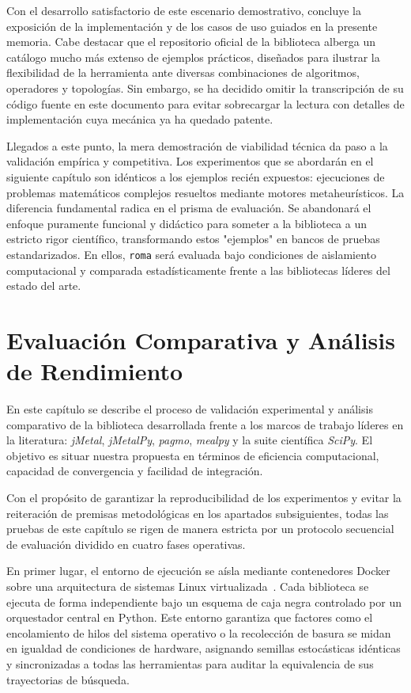 \documentclass[12pt,a4paper,twoside,openright]{book}
\begin{document}

    Con el desarrollo satisfactorio de este escenario demostrativo, concluye la exposición de la implementación y de los casos de uso guiados en la presente memoria. Cabe destacar que el repositorio oficial de la biblioteca alberga un catálogo mucho más extenso de ejemplos prácticos, diseñados para ilustrar la flexibilidad de la herramienta ante diversas combinaciones de algoritmos, operadores y topologías. Sin embargo, se ha decidido omitir la transcripción de su código fuente en este documento para evitar sobrecargar la lectura con detalles de implementación cuya mecánica ya ha quedado patente.

    Llegados a este punto, la mera demostración de viabilidad técnica da paso a la validación empírica y competitiva. Los experimentos que se abordarán en el siguiente capítulo son idénticos a los ejemplos recién expuestos: ejecuciones de problemas matemáticos complejos resueltos mediante motores metaheurísticos. La diferencia fundamental radica en el prisma de evaluación. Se abandonará el enfoque puramente funcional y didáctico para someter a la biblioteca a un estricto rigor científico, transformando estos "ejemplos" en bancos de pruebas estandarizados. En ellos, \texttt{roma} será evaluada bajo condiciones de aislamiento computacional y comparada estadísticamente frente a las bibliotecas líderes del estado del arte.

%
%
%

\chapter{Evaluación Comparativa y Análisis de Rendimiento}
    En este capítulo se describe el proceso de validación experimental y análisis comparativo de la biblioteca desarrollada frente a los marcos de trabajo líderes en la literatura: \textit{jMetal}, \textit{jMetalPy}, \textit{pagmo}, \textit{mealpy} y la suite científica \textit{SciPy}. El objetivo es situar nuestra propuesta en términos de eficiencia computacional, capacidad de convergencia y facilidad de integración.

    Con el propósito de garantizar la reproducibilidad de los experimentos y evitar la reiteración de premisas metodológicas en los apartados subsiguientes, todas las pruebas de este capítulo se rigen de manera estricta por un protocolo secuencial de evaluación dividido en cuatro fases operativas. 

    En primer lugar, el entorno de ejecución se aísla mediante contenedores Docker sobre una arquitectura de sistemas Linux virtualizada~\cite{docker2025}. Cada biblioteca se ejecuta de forma independiente bajo un esquema de caja negra controlado por un orquestador central en Python. Este entorno garantiza que factores como el encolamiento de hilos del sistema operativo o la recolección de basura se midan en igualdad de condiciones de hardware, asignando semillas estocásticas idénticas y sincronizadas a todas las herramientas para auditar la equivalencia de sus trayectorias de búsqueda.
\end{document}
